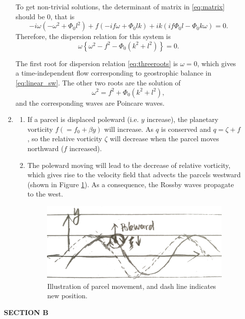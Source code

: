 \documentclass[a4paper]{article}
\begin{document}
\begin{enumerate}[label=\textbf{\arabic*.}]
\begin{enumerate}[label=\textbf{(\alph*)}]
		To get non-trivial solutions, the determinant of matrix in \eqref{eq:matrix} should be 0, that is	
		$$-i\omega(-\omega^2+\Phi_0l^2)+f(-if\omega+\Phi_0lk)+ik(if\Phi_0l-\Phi_0k\omega)=0.$$
		Therefore, the  dispersion relation for this system is 
		\begin{equation}\label{eq:threeroots}
			\omega \left\{\omega^{ 2} - f^{2} - \Phi_{0} \left( k^{2} + l^{2} \right) \right\} = 0.
		\end{equation}
		
		The first root for dispersion relation \eqref{eq:threeroots} is
		$\omega=0$, which gives a time-independent flow corresponding to geostrophic balance in \eqref{eq:linear_sw}. The other two roots are the solution of $$\omega^2 = f^{2} + \Phi_{0} \left( k^{2} + l^{2} \right),$$ and the corresponding waves are Poincare waves.
		\vspace{1cm}
		\item 
			\begin{enumerate}[label=(\roman*)]
			\item %
				
			 If a parcel is displaced poleward (i.e. $y$ increase), the planetary vorticity $f(=f_0+\beta y)$ will increase. As $q$ is conserved and $q=\zeta +f$, so the relative vorticity $\zeta$ will decrease when the parcel moves northward ($f$ increased).
			 \item 
			 The poleward moving will lead to the decrease of relative vorticity, which gives rise to the velocity field that advects the parcels westward (shown in Figure \ref{fig:rossby}). As a consequence, the Rossby waves propagate to the west.
			 \begin{figure}[H]
			 	\centering
			 	\includegraphics[width=0.4\linewidth]{./rossbywaveillustration.png}
			 	\caption{Illustration of parcel movement, and dash line indicates new position.}
			 	\label{fig:rossby}
			 \end{figure}
			\end{enumerate}
		\end{enumerate}
	\vspace{1.0cm}
	\newpage
 \textbf{SECTION B}


\end{enumerate}
\end{document}
